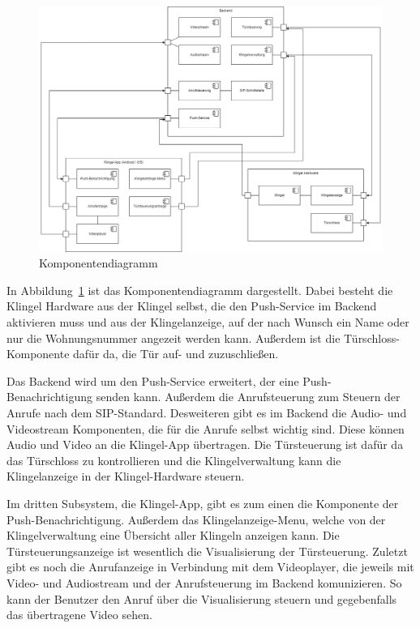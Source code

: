 \begin{figure}[ht!]
    \centering\includegraphics[width=\paperwidth/2]{../assets/img/Komponentendiagramm}

    \caption{Komponentendiagramm}
    \label{fig:komponentendiagramm}
\end{figure}
In Abbildung~\ref{fig:komponentendiagramm} ist das Komponentendiagramm dargestellt.
Dabei besteht die Klingel Hardware aus der Klingel selbst, die den Push-Service im Backend aktivieren muss 
und aus der Klingelanzeige, auf der nach Wunsch ein Name oder nur die Wohnungsnummer angezeit werden kann.
Außerdem ist die Türschloss-Komponente dafür da, die Tür auf- und zuzuschließen.

Das Backend wird um den Push-Service erweitert, der eine Push-Benachrichtigung senden kann.
Außerdem die Anrufsteuerung zum Steuern der Anrufe nach dem SIP-Standard.
Desweiteren gibt es im Backend die Audio- und Videostream Komponenten, die für die Anrufe selbst wichtig sind.
Diese können Audio und Video an die Klingel-App übertragen.
Die Türsteuerung ist dafür da das Türschloss zu kontrollieren und die Klingelverwaltung kann die Klingelanzeige in der Klingel-Hardware steuern.

Im dritten Subsystem, die Klingel-App, gibt es zum einen die Komponente der Push-Benachrichtigung.
Außerdem das Klingelanzeige-Menu, welche von der Klingelverwaltung eine Übersicht aller Klingeln anzeigen kann.
Die Türsteuerungsanzeige ist wesentlich die Visualisierung der Türsteuerung.
Zuletzt gibt es noch die Anrufanzeige in Verbindung mit dem Videoplayer, die jeweils mit Video- und Audiostream und der Anrufsteuerung im Backend komunizieren.
So kann der Benutzer den Anruf über die Visualisierung steuern und gegebenfalls das übertragene Video sehen.